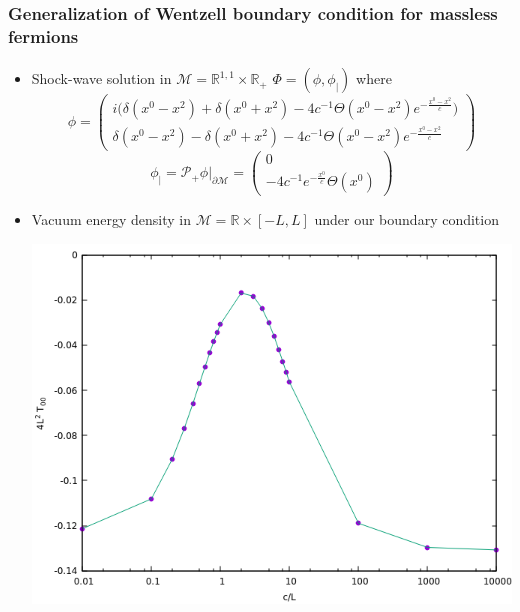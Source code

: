 \documentclass[english]{beamer}
\begin{document}
\begin{frame}[shrink=30]
\frametitle{\small{Generalization of Wentzell boundary condition for massless fermions}}
\framesubtitle{}

\begin{itemize}

\item<1-> Shock-wave solution in $\mathcal{M} = \mathbb{R}^{1,1}\times\mathbb{R}_+$ $\Phi = (\phi, \phi_|)$
where
\begin{equation*}
\phi = \begin{pmatrix}
i \big(\delta(x^0 - x^2) + \delta(x^0 + x^2) - 4c^{-1}\Theta(x^0-x^2)e^{- \frac{x^0-x^2}{c}} \big) \\
\delta({x^0 - x^2}) - \delta(x^0 + x^2) - 4c^{-1}\Theta(x^0-x^2)e^{- \frac{x^0-x^2}{c}} \end{pmatrix}
\end{equation*}
\begin{equation*}
\phi_| = \mathcal{P}_+ \phi\vert_{\partial \mathcal{M}} = 
\begin{pmatrix} 0 \\ -4c^{-1}e^{- \frac{x^0}{c}} \Theta(x^0) \end{pmatrix}
\end{equation*}


\item<2-> Vacuum energy density in $\mathcal{M} = \mathbb{R}\times [-L, L] $ under our boundary condition
		
	\includegraphics[scale=0.5]{T00}\centering



\end{itemize}

\end{frame}
\end{document}
